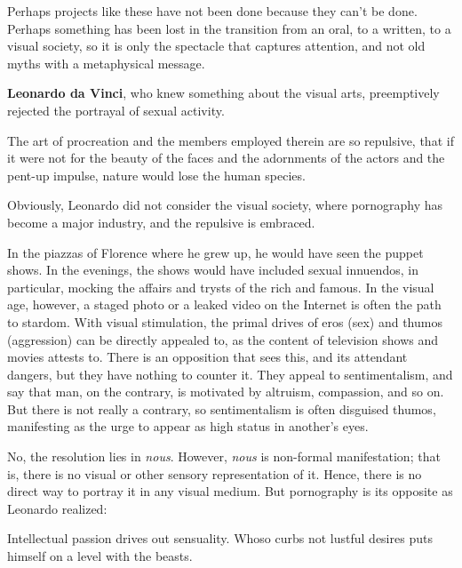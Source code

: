 Perhaps projects like these have not been done because they can't be done. Perhaps something has been lost in the transition from an oral, to a written, to a visual society, so it is only the spectacle that captures attention, and not old myths with a metaphysical message.

\textbf{Leonardo da Vinci}, who knew something about the visual arts, preemptively rejected the portrayal of sexual activity.

\begin{quotex}
The art of procreation and the members employed therein are so repulsive, that if it were not for the beauty of the faces and the adornments of the actors and the pent-up impulse, nature would lose the human species.
\end{quotex}


Obviously, Leonardo did not consider the visual society, where pornography has become a major industry, and the repulsive is embraced.

In the piazzas of Florence where he grew up, he would have seen the puppet shows. In the evenings, the shows would have included sexual innuendos, in particular, mocking the affairs and trysts of the rich and famous. In the visual age, however, a staged photo or a leaked video on the Internet is often the path to stardom. With visual stimulation, the primal drives of eros (sex) and thumos (aggression) can be directly appealed to, as the content of television shows and movies attests to. There is an opposition that sees this, and its attendant dangers, but they have nothing to counter it. They appeal to sentimentalism, and say that man, on the contrary, is motivated by altruism, compassion, and so on. But there is not really a contrary, so sentimentalism is often disguised thumos, manifesting as the urge to appear as high status in another's eyes.

No, the resolution lies in \emph{nous}. However, \emph{nous} is non-formal manifestation; that is, there is no visual or other sensory representation of it. Hence, there is no direct way to portray it in any visual medium. But pornography is its opposite as Leonardo realized:

\begin{quotex}
Intellectual passion drives out sensuality. Whoso curbs not lustful desires puts himself on a level with the beasts.
\end{quotex}




